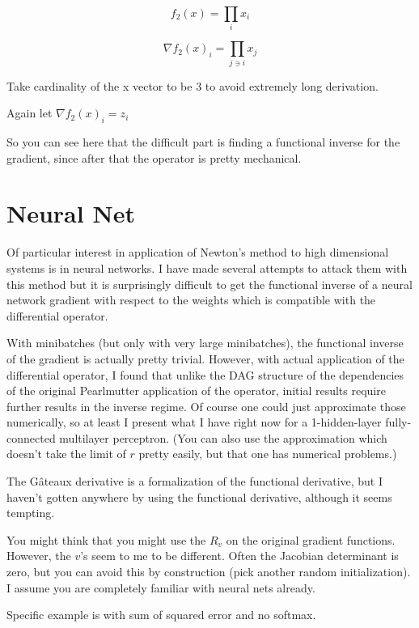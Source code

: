 \documentclass{article}
\begin{document}
$$ f_2(x) = \prod_i x_i$$

$$ \nabla f_2(x)_i = \prod_{j \ni i} x_j$$

Take cardinality of the x vector to be 3 to avoid extremely long derivation.

Again let $ \nabla f_2(x)_i = z_i$


So you can see here that the difficult part is finding a functional inverse for the gradient, since after that the operator is pretty mechanical.

\section{Neural Net}

Of particular interest in application of Newton's method to high dimensional systems is in neural networks. I have made several attempts to attack them with this method but it is surprisingly difficult to get the functional inverse of a neural network gradient with respect to the weights which is compatible with the differential operator.

With minibatches (but only with very large minibatches), the functional inverse of the gradient is actually pretty trivial. However, with actual application of the differential operator, I found that unlike the DAG structure of the dependencies of the original Pearlmutter application of the operator, initial results require further results in the inverse regime. Of course one could just approximate those numerically, so at least I present what I have right now for a 1-hidden-layer fully-connected multilayer perceptron. (You can also use the approximation which doesn't take the limit of $r$ pretty easily, but that one has numerical problems.)

The G\^{a}teaux derivative is a formalization of the functional derivative, but I haven't gotten anywhere by using the functional derivative, although it seems tempting.

You might think that you might use the $R_v$ on the original gradient functions. However, the $v$'s seem to me to be different. Often the Jacobian determinant is zero, but you can avoid this by construction (pick another random initialization). I assume you are completely familiar with neural nets already\cite{deeplearning}.

Specific example is with sum of squared error and no softmax.
\end{document}
